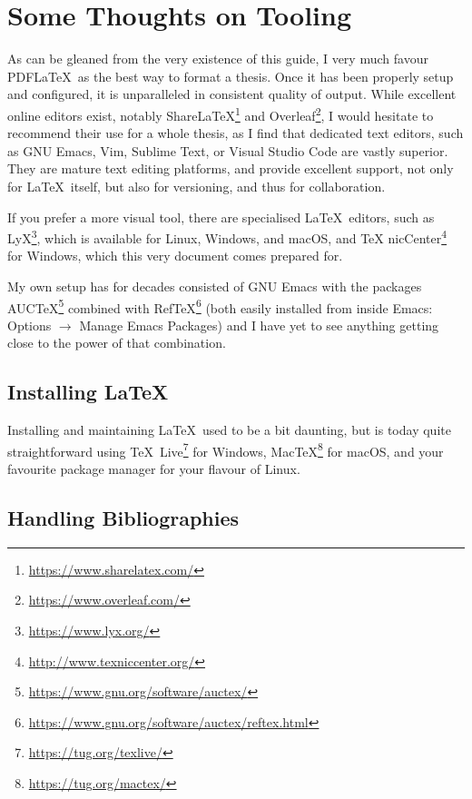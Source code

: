
\chapter*{Some Thoughts on Tooling}
\label{cha:some-thoughts-tool}


As can be gleaned from the very existence of this guide, I very much
favour PDF\LaTeX\ as the best way to format a thesis. Once it has been
properly setup and configured, it is unparalleled in consistent
quality of output.  While excellent online editors exist, notably
Share\LaTeX\footnote{\url{https://www.sharelatex.com/}} and
Overleaf\footnote{\url{https://www.overleaf.com/}}, I would hesitate
to recommend their use for a whole thesis, as I find that dedicated
text editors, such as GNU Emacs, Vim, Sublime Text, or Visual Studio
Code are vastly superior.  They are mature text editing platforms, and
provide excellent support, not only for \LaTeX\ itself, but also for
versioning, and thus for collaboration.

If you prefer a more visual tool, there are specialised \LaTeX\
editors, such as LyX\footnote{\url{https://www.lyx.org/}}, which is
available for Linux, Windows, and macOS, and \TeX
nicCenter\footnote{\url{http://www.texniccenter.org/}} for Windows,
which this very document comes prepared for.

My own setup has for decades consisted of GNU Emacs with the packages
AUC\TeX\footnote{\url{https://www.gnu.org/software/auctex/}} combined
with
Ref\TeX\footnote{\url{https://www.gnu.org/software/auctex/reftex.html}}
(both easily installed from inside Emacs: Options $\rightarrow$ Manage
Emacs Packages) and I have yet to see anything getting close to the
power of that combination.

\section*{Installing \LaTeX}
\label{sec:installing-latex}

Installing and maintaining \LaTeX\ used to be a bit daunting, but is today
quite straightforward using \TeX\
Live\footnote{\url{https://tug.org/texlive/}} for Windows,
Mac\TeX\footnote{\url{https://tug.org/mactex/}} for mac\-OS, and your
favourite package manager for your flavour of Linux.

\section*{Handling Bibliographies}
\label{sec:handl-bibl}

